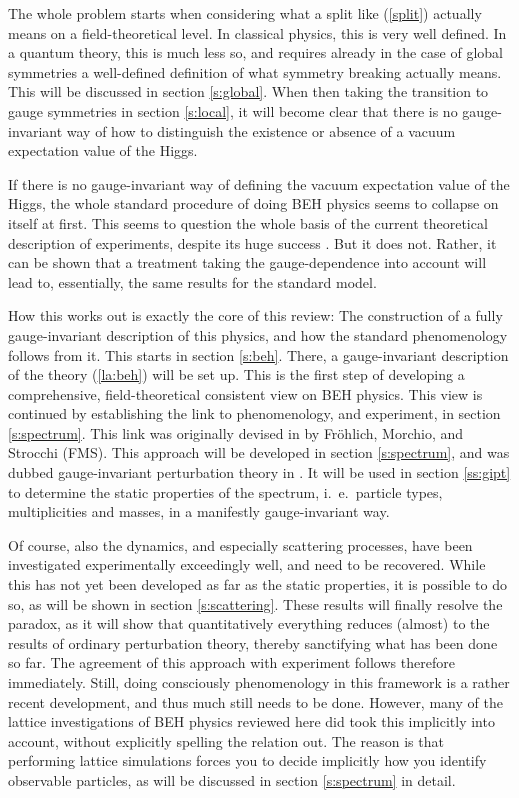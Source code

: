 \documentclass[final,12pt]{article}
\newcommand*{\pref}[1]{(\ref{#1})}
\newcommand*{\1}{1\!\!\!\bot}
\begin{document}
The whole problem starts when considering what a split like \pref{split} actually means on a field-theoretical level. In classical physics, this is very well defined. In a quantum theory, this is much less so, and requires already in the case of global symmetries a well-defined definition of what symmetry breaking actually means. This will be discussed in section \ref{s:global}. When then taking the transition to gauge symmetries in section \ref{s:local}, it will become clear that there is no gauge-invariant way of how to distinguish the existence or absence of a vacuum expectation value of the Higgs.

If there is no gauge-invariant way of defining the vacuum expectation value of the Higgs, the whole standard procedure \cite{Bohm:2001yx} of doing BEH physics seems to collapse on itself at first. This seems to question the whole basis of the current theoretical description of experiments, despite its huge success \cite{pdg}. But it does not. Rather, it can be shown that a treatment taking the gauge-dependence into account will lead to, essentially, the same results for the standard model.

How this works out is exactly the core of this review: The construction of a fully gauge-invariant description of this physics, and how the standard phenomenology follows from it. This starts in section \ref{s:beh}. There, a gauge-invariant description of the theory \pref{la:beh} will be set up. This is the first step of developing a comprehensive, field-theoretical consistent view on BEH physics. This view is continued by establishing the link to phenomenology, and experiment, in section \ref{s:spectrum}. This link was originally devised in \cite{Frohlich:1980gj,Frohlich:1981yi} by Fr\"ohlich, Morchio, and Strocchi (FMS). This approach will be developed in section \ref{s:spectrum}, and was dubbed gauge-invariant perturbation theory in \cite{Seiler:2015rwa}. It will be used in section \ref{ss:gipt} to determine the static properties of the spectrum, i.\ e.\ particle types, multiplicities and masses, in a manifestly gauge-invariant way.

Of course, also the dynamics, and especially scattering processes, have been investigated experimentally exceedingly well, and need to be recovered. While this has not yet been developed as far as the static properties, it is possible to do so, as will be shown in section \ref{s:scattering}. These results will finally resolve the paradox, as it will show that quantitatively everything reduces (almost) to the results of ordinary perturbation theory, thereby sanctifying what has been done so far. The agreement of this approach with experiment follows therefore immediately. Still, doing consciously phenomenology in this framework is a rather recent development, and thus much still needs to be done. However, many of the lattice investigations of BEH physics reviewed here did took this implicitly into account, without explicitly spelling the relation out. The reason is that performing lattice simulations forces you to decide implicitly how you identify observable particles, as will be discussed in section \ref{s:spectrum} in detail.
\end{document}
